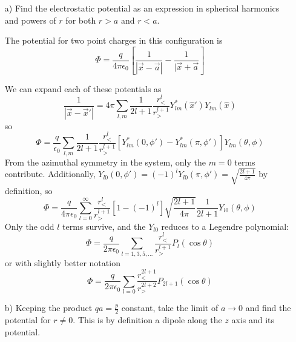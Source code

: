 \documentclass[a4paper,twoside]{article}
\begin{document}
\begin{itemize}
    \item[a)] Find the electrostatic potential as an expression in spherical harmonics and powers of $r$ for both $r>a$ and $r<a$.
   \begin{tcolorbox}
       The potential for two point charges in this configuration is
       \begin{equation}
           \Phi = \frac{q}{4\pi\epsilon_0}\left[\frac{1}{|\vec{x}-\vec{a}|} - \frac{1}{|\vec{x}+\vec{a}}\right] 
       \end{equation}

       We can expand each of these potentials as
       \begin{equation}
           \frac{1}{|\vec{x}-\vec{x}'|} = 4\pi\sum_{l,m} \frac{1}{2l+1}\frac{r^l_<}{r^{l+1}_>}Y^*_{lm}(\hat{x}')Y_{lm}(\hat{x})
       \end{equation}
       so
       \begin{equation}
           \Phi = \frac{q}{\epsilon_0}\sum_{l,m} \frac{1}{2l+1} \frac{r^l_<}{r^{l+1}_>}[Y^*_{lm}(0,\phi')-Y^*_{lm}(\pi,\phi')]Y_{lm}(\theta,\phi)
       \end{equation}
       From the azimuthal symmetry in the system, only the $m=0$ terms contribute. Additionally, $Y_{l 0}(0,\phi') = (-1)^lY_{l 0}(\pi,\phi') = \sqrt{\frac{2l+1}{4\pi}}$ by definition, so
       \begin{equation}
           \Phi = \frac{q}{4\pi\epsilon_0}\sum_{l=0}^{\infty}\frac{r^l_<}{r^{l+1}_>}[1-(-1)^l]\sqrt{\frac{2l+1}{4\pi}}\frac{1}{2l+1}Y_{l 0}(\theta,\phi) 
       \end{equation}
       Only the odd $l$ terms survive, and the $Y_{l 0}$ reduces to a Legendre polynomial:
       \begin{equation}
           \Phi = \frac{q}{2\pi\epsilon_0}\sum_{l=1,3,5, \ldots}\frac{r^l_<}{r^{l+1}_>}P_l(\cos\theta)
       \end{equation}
       or with slightly better notation
       \begin{equation}
           \Phi = \frac{q}{2\pi\epsilon_0}\sum_{l=0}\frac{r^{2l+1}_<}{r^{2l+2}_>}P_{2l+1}(\cos\theta)
       \end{equation}
   \end{tcolorbox} 
    \item[b)] Keeping the product $qa = \frac{p}{2}$ constant, take the limit of $a\to 0$ and find the potential for $r\neq 0$. This is by definition a dipole along the $z$ axis and its potential.
        \begin{tcolorbox}[breakable]

\end{tcolorbox}
\end{itemize}
\end{document}
